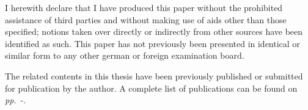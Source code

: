 


\begin{declaration}        %

I herewith declare that I have produced this paper without the prohibited assistance of third parties and without making use of aids other than those specified; notions taken over directly or indirectly from other sources have been identified as such. This paper has not previously been presented in identical or similar form to any other german or foreign examination board.

The related contents in this thesis have been previously published or submitted for publication by the author. A complete list of publications can be found on \textit{pp.}~\pageref{chap:PubList}-\pageref{chap:endPubList}.

\vspace{10mm}




\end{declaration}


